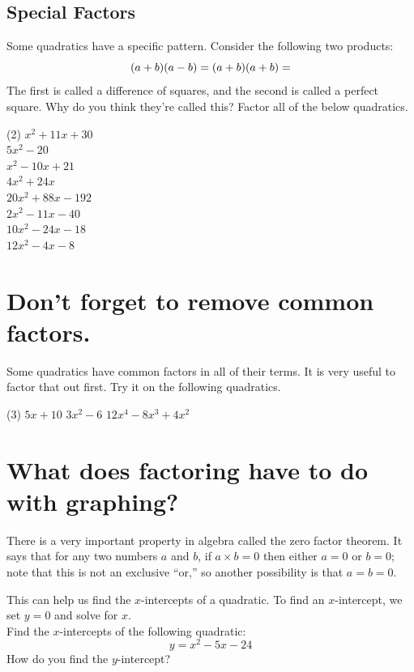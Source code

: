 \documentclass[12pt,fleqn]{book}
\begin{document}
\subsection*{Special Factors}
Some quadratics have a specific pattern.  Consider the following two products:
\[
    (a+b)(a-b) = 
    \hfill 
    (a+b)(a+b) =
    \hfill 
\]
The first is called a difference of squares, and the second is called a perfect square.  Why do you think they're called this?
\vfill 
\clearpage
Factor all of the below quadratics.
\begin{tasks}(2)
	\task $x^2+11x + 30$\\[2em]
	\task $5x^2 - 20 $\\[2em]
	\task $x^2-10x +21 $\\[2em]
	\task $4x^2 + 24x $\\[2em]
	\task $20x^2+88x-192 $\\[2em]
	\task $2x^2 -11x -40 $\\[2em]
	\task $10x^2 -24x -18 $\\[2em]
	\task $12x^2-4x-8$\\[2em]
\end{tasks}
\section*{Don't forget to remove common factors.}
Some quadratics have common factors in all of their terms.  It is very useful to factor that out first.  Try it on the following quadratics.
\begin{tasks}(3)
\task $5 x+10$
\task $3 x^2-6$
\task $12 x^4-8 x^3+4 x^2$
\end{tasks}
\vspace{1.5in}
\section*{What does factoring have to do with graphing?}
There is a very important property in algebra called the zero factor theorem.  It says that for any two numbers $a$ and $b$, if $a\times b = 0$ then either $a=0$ or $b=0$; note that this is not an exclusive ``or,'' so another possibility is that $a=b=0$. 

This can help us find the $x$-intercepts of a quadratic.  To find an $x$-intercept, we set $y=0$ and solve for $x$.
\\[1em]
Find the $x$-intercepts of the following quadratic:
\[y=x^2-5x-24\]
\vfill How do you find the $y$-intercept?
\clearpage
\end{document}
